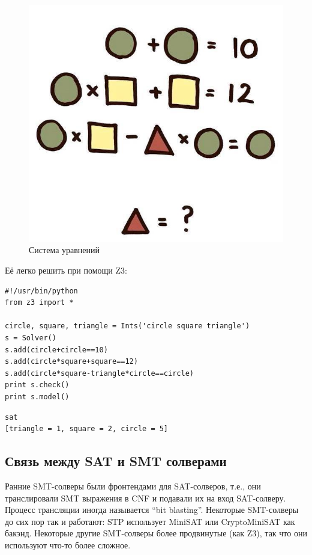 \begin{figure}[H]
\centering
\includegraphics[scale=0.3]{SMT/equation.jpg}
\caption{Система уравнений}
\end{figure}

Её легко решить при помощи Z3:

\begin{lstlisting}
#!/usr/bin/python
from z3 import *

circle, square, triangle = Ints('circle square triangle')
s = Solver()
s.add(circle+circle==10)
s.add(circle*square+square==12)
s.add(circle*square-triangle*circle==circle)
print s.check()
print s.model()
\end{lstlisting}

\begin{lstlisting}
sat
[triangle = 1, square = 2, circle = 5]
\end{lstlisting}

\subsection{Связь между \ac{SAT} и \ac{SMT} солверами}

Ранние \ac{SMT}-солверы были фронтендами для \ac{SAT}-солверов, т.е.,
они транслировали SMT выражения в \ac{CNF} и подавали их на вход SAT-солверу.
Процесс трансляции иногда называется ``bit blasting''.
Некоторые \ac{SMT}-солверы до сих пор так и работают: STP использует MiniSAT или CryptoMiniSAT как бакэнд.
Некоторые другие \ac{SMT}-солверы более продвинутые (как Z3), так что они используют что-то более сложное.










